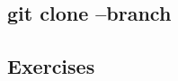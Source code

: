 \subsection{git clone --branch}
\begin{frame}[fragile]
  \subslidetitle
\end{frame}

\subsection{Exercises}
\begin{frame}[fragile]
  \subslidetitle
\end{frame}
